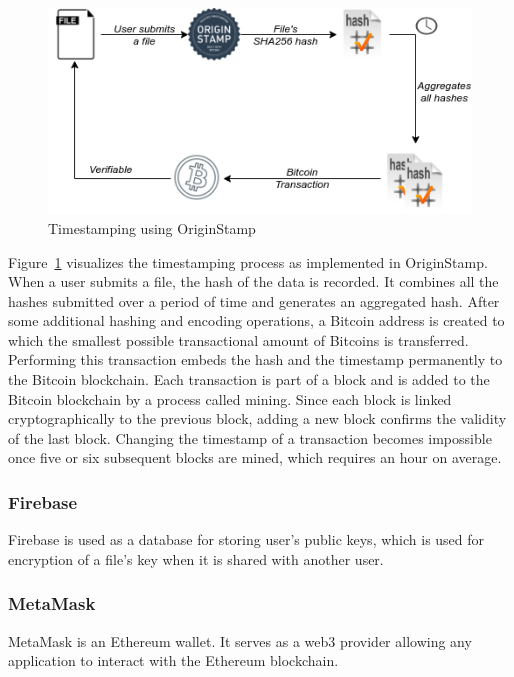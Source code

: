 \begin{figure}[h]
	\includegraphics[width=\linewidth]{figures/origin-stamp}
	\caption{\label{fig:originstamp} Timestamping using OriginStamp}
\end{figure}

Figure~\ref{fig:originstamp} visualizes the timestamping process as implemented in OriginStamp. When a user submits a file, the hash of the data is recorded. It combines all the hashes submitted over a period of time and generates an aggregated hash. After some additional hashing and encoding operations, a Bitcoin address is created to which the smallest possible transactional amount of Bitcoins is transferred. Performing this transaction embeds the hash and the timestamp permanently to the Bitcoin blockchain. Each transaction is part of a block and is added to the Bitcoin blockchain by a process called mining. Since each block is linked cryptographically to the previous block, adding a new block confirms the validity of the last block. Changing the timestamp of a transaction becomes impossible once five or six subsequent blocks are mined, which requires an hour on average\cite{nakamoto2008bitcoin}.

\subsubsection{Firebase}
Firebase\cite{web:firebase:1} is used as a database for storing user's public keys, which is used for encryption of a file's key when it is shared with another user.

\subsubsection{MetaMask}
MetaMask\cite{web:metamask:1} is an Ethereum wallet. It serves as a web3\cite{web:web3:1} provider allowing any application to interact with the Ethereum blockchain.

